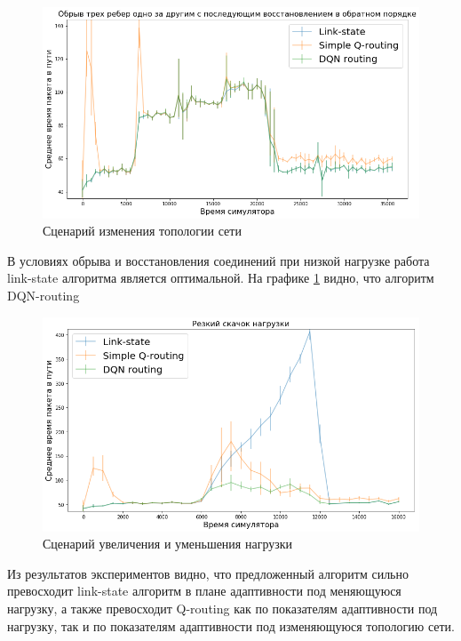\documentclass[specification, annotation]{itmo-student-thesis}
\begin{document}
\begin{figure}[!h]
  \caption{Сценарий изменения топологии сети}\label{experiment-link-failures}
  \centering
  \includegraphics[scale=0.6]{experiment-link-failures}
\end{figure}

В условиях обрыва и восстановления соединений при низкой нагрузке работа
link-state алгоритма является оптимальной. На графике
\ref{experiment-link-failures} видно, что алгоритм DQN-routing 

\begin{figure}[!h]
  \caption{Сценарий увеличения и уменьшения нагрузки}\label{experiment-peak-load}
  \centering
  \includegraphics[scale=0.6]{experiment-peak-load}
\end{figure}

Из результатов экспериментов видно, что предложенный алгоритм сильно превосходит
link-state алгоритм в плане адаптивности под меняющуюся нагрузку, а также
превосходит Q-routing как по показателям адаптивности под нагрузку, так и по
показателям адаптивности под изменяющуюся топологию сети.
\end{document}
